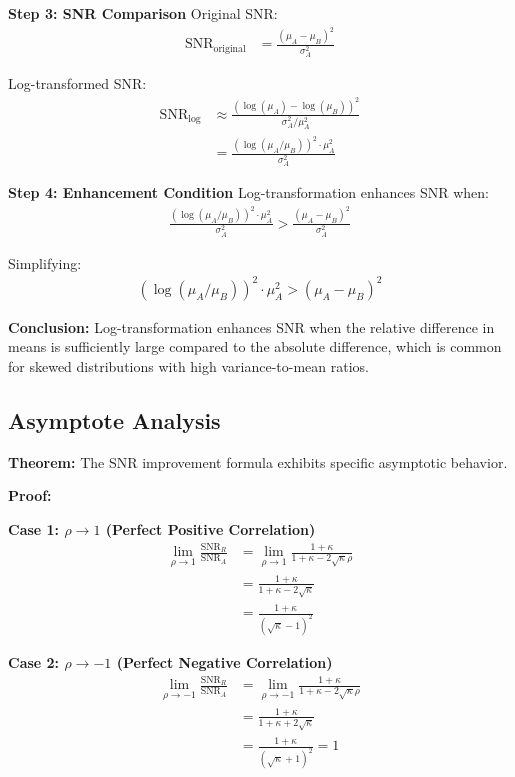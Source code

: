 \textbf{Step 3: SNR Comparison}
Original SNR:
\begin{align}
\text{SNR}_{\text{original}} &= \frac{(\mu_A - \mu_B)^2}{\sigma_A^2}
\end{align}

Log-transformed SNR:
\begin{align}
\text{SNR}_{\text{log}} &\approx \frac{(\log(\mu_A) - \log(\mu_B))^2}{\sigma_A^2/\mu_A^2} \\
&= \frac{(\log(\mu_A/\mu_B))^2 \cdot \mu_A^2}{\sigma_A^2}
\end{align}

\textbf{Step 4: Enhancement Condition}
Log-transformation enhances SNR when:
\begin{align}
\frac{(\log(\mu_A/\mu_B))^2 \cdot \mu_A^2}{\sigma_A^2} > \frac{(\mu_A - \mu_B)^2}{\sigma_A^2}
\end{align}

Simplifying:
\begin{align}
(\log(\mu_A/\mu_B))^2 \cdot \mu_A^2 > (\mu_A - \mu_B)^2
\end{align}

\textbf{Conclusion:} Log-transformation enhances SNR when the relative difference in means is sufficiently large compared to the absolute difference, which is common for skewed distributions with high variance-to-mean ratios.

\subsection{Asymptote Analysis}

\textbf{Theorem:} The SNR improvement formula exhibits specific asymptotic behavior.

\textbf{Proof:}

\textbf{Case 1: $\rho \to 1$ (Perfect Positive Correlation)}
\begin{align}
\lim_{\rho \to 1} \frac{\text{SNR}_R}{\text{SNR}_A} &= \lim_{\rho \to 1} \frac{1 + \kappa}{1 + \kappa - 2\sqrt{\kappa}\rho} \\
&= \frac{1 + \kappa}{1 + \kappa - 2\sqrt{\kappa}} \\
&= \frac{1 + \kappa}{(\sqrt{\kappa} - 1)^2}
\end{align}

\textbf{Case 2: $\rho \to -1$ (Perfect Negative Correlation)}
\begin{align}
\lim_{\rho \to -1} \frac{\text{SNR}_R}{\text{SNR}_A} &= \lim_{\rho \to -1} \frac{1 + \kappa}{1 + \kappa - 2\sqrt{\kappa}\rho} \\
&= \frac{1 + \kappa}{1 + \kappa + 2\sqrt{\kappa}} \\
&= \frac{1 + \kappa}{(\sqrt{\kappa} + 1)^2} = 1
\end{align}

